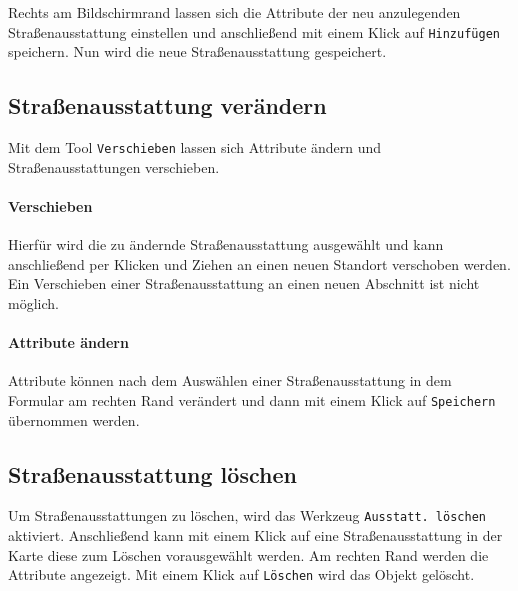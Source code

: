 \documentclass[a4paper,11pt,bibliography=totoc, listof=totoc,titlepage]{scrartcl}
\begin{document}
Rechts am Bildschirmrand lassen sich die Attribute der neu anzulegenden Straßenausstattung einstellen und anschließend mit einem Klick auf \verb|Hinzufügen| speichern. Nun wird die neue Straßenausstattung gespeichert.

\subsection{Straßenausstattung verändern}
Mit dem Tool \verb|Verschieben| lassen sich Attribute ändern und Straßenausstattungen verschieben. 

\paragraph{Verschieben} 
Hierfür wird die zu ändernde Straßenausstattung ausgewählt und kann anschließend per Klicken und Ziehen an einen neuen Standort verschoben werden. Ein Verschieben einer Straßenausstattung an einen neuen Abschnitt ist nicht möglich.

\paragraph{Attribute ändern}
Attribute können nach dem Auswählen einer Straßenausstattung in dem Formular am rechten Rand verändert und dann mit einem Klick auf \verb|Speichern| übernommen werden.

\subsection{Straßenausstattung löschen}
Um Straßenausstattungen zu löschen, wird das Werkzeug \verb|Ausstatt. löschen| aktiviert. Anschließend kann mit einem Klick auf eine Straßenausstattung in der Karte diese zum Löschen vorausgewählt werden. Am rechten Rand werden die Attribute angezeigt. Mit einem Klick auf \verb|Löschen| wird das Objekt gelöscht.

\clearpage

\printglossaries
\end{document}
